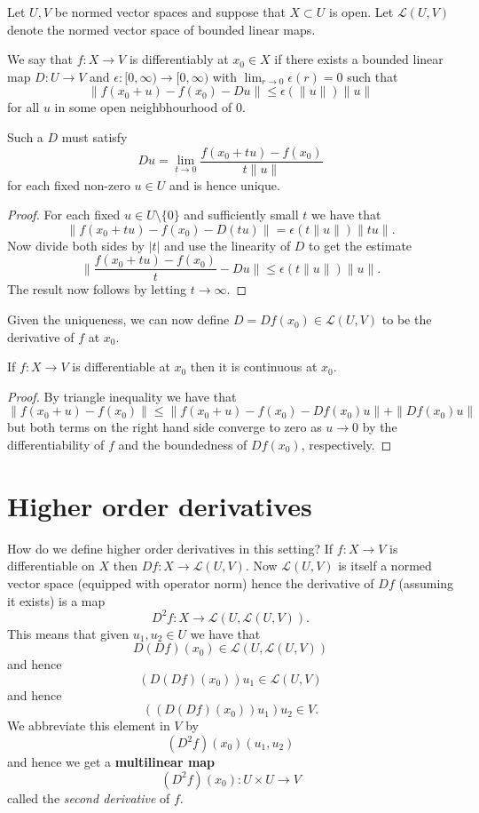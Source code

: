 \documentclass[twoside, a4paper, 10pt]{amsart}
\begin{document}
Let $U,V$ be normed vector spaces and suppose that $X \subset U$ is open. Let $\mathcal{L}(U,V)$ denote the normed vector space of bounded linear maps.

\begin{mydef} 

We say that $f: X \to V$ is differentiably at $x_0 \in X$ if there exists a bounded linear map $D: U \to V$ and $\epsilon: [0,\infty) \to [0, \infty)$ with $\lim_{r \to 0} \epsilon(r) = 0$ such that $$\| f (x_0+u) - f(x_0) - Du \| \leq  \epsilon( \|u \|) \|u \|$$ for all $u$ in some open neighbhourhood of $0$.

\end{mydef}

\begin{lemma} Such a $D$ must satisfy $$ Du = \lim_{t \to 0} \frac{f(x_0+tu) - f(x_0)}{t \|u \|} $$ for each fixed non-zero $u \in U$ and is hence unique. \end{lemma}

\begin{proof} For each fixed $u \in U \setminus \{0 \} $ and sufficiently small $t$ we have that $$\| f(x_0+tu) - f(x_0) - D(tu) \| = \epsilon(t \| u \|) \|t u \|. $$ Now divide both sides by $|t|$ and use the linearity of $D$ to get the estimate $$ \| \frac{f(x_0+tu) - f(x_0)}{t } - Du \| \leq \epsilon(t \|u \|) \| u \|.$$  The result now follows by letting $t \to \infty$. \end{proof}

Given the uniqueness, we can now define $D = Df(x_0) \in \mathcal{L}(U,V)$ to be the derivative of $f$ at $x_0$. 

\begin{lemma} If $f:X \to V$ is differentiable at $x_0$ then it is continuous at $x_0$. \end{lemma}

\begin{proof} By triangle inequality we have that $$\| f(x_0 + u) - f(x_0) \| \leq  \| f(x_0 + u ) - f(x_0) - Df(x_0) u \| + \|Df(x_0)u \|$$ but both terms on the right hand side converge to zero as $u \to 0$ by the differentiability of $f$ and the boundedness of $Df(x_0)$, respectively. \end{proof}

\section{Higher order derivatives}

How do we define higher order derivatives in this setting? If $f:X \to V$ is differentiable on $X$ then $Df: X \to \mathcal{L}(U,V)$. Now $\mathcal{L}(U,V)$ is itself a normed vector space (equipped with operator norm) hence the derivative of $Df$ (assuming it exists) is a map $$D^2 f: X \to \mathcal{L}(U, \mathcal{L}(U,V)).$$ This means that given $u_1, u_2 \in U$ we have that $$D(Df)(x_0) \in \mathcal{L}(U,\mathcal{L}(U,V))$$ and hence $$(D(Df)(x_0) )u_1 \in \mathcal{L}(U,V)$$ and hence $$((D(Df)(x_0))u_1)u_2 \in V.$$ We abbreviate this element in $V$ by $$(D^2f)  (x_0) (u_1, u_2)$$ and hence we get a \textbf{multilinear map} $$(D^2 f) (x_0):U \times U \to V$$ called the \textit{second derivative} of $f$.
\end{document}
